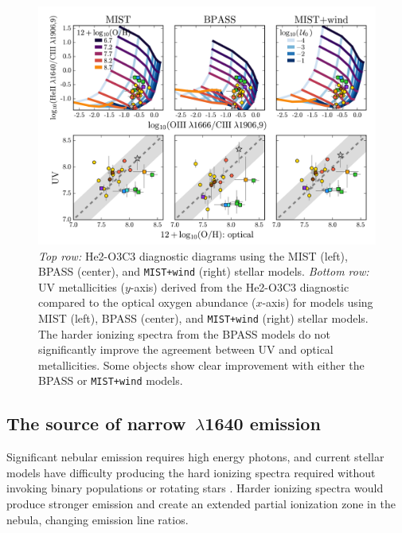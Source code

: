 \documentclass[preprint2]{aastex62}
\newcommand{\heii}{\ion{He}{2}}
\begin{document}
\begin{figure}
  \begin{center}
    \includegraphics[width=\linewidth]{figs/f8.png}
    \caption{\emph{Top row:} He2-O3C3 diagnostic diagrams using the MIST (left), BPASS (center), and {\tt MIST+wind} (right) stellar models. \emph{Bottom row:} UV metallicities ($y$-axis) derived from the He2-O3C3 diagnostic compared to the optical oxygen abundance ($x$-axis) for models using MIST (left), BPASS (center), and {\tt MIST+wind} (right) stellar models. The harder ionizing spectra from the BPASS models do not significantly improve the agreement between UV and optical metallicities. Some objects show clear improvement with either the BPASS or {\tt MIST+wind} models.}
    \label{fig:HeIIdds}
  \end{center}
\end{figure}

\subsection{The source of narrow $\,\lambda$1640 emission} \label{sec:discussion:HeII}

Significant nebular \heii{} emission requires high energy photons, and current stellar models have difficulty producing the hard ionizing spectra required without invoking binary populations or rotating stars \citep[e.g.,][]{Stark+2014, Steidel+2016, Choi+2017, Byler+2017}. Harder ionizing spectra would produce stronger \heii{} emission and create an extended partial ionization zone in the nebula, changing emission line ratios.
\end{document}
